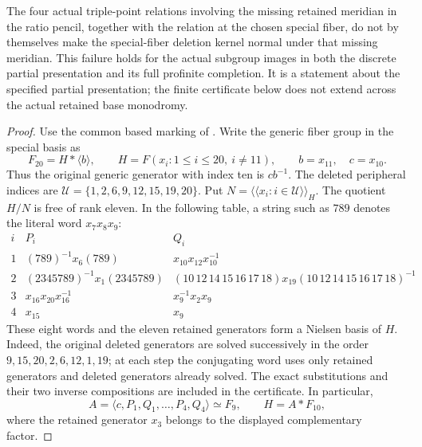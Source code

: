 The four actual triple-point relations involving the missing retained
meridian in the ratio pencil, together with the relation at the chosen
special fiber, do not by themselves make the special-fiber deletion
kernel normal under that missing meridian. This failure holds for the
actual subgroup images in both the discrete partial presentation and
its full profinite completion. It is a statement about the specified
partial presentation; the finite certificate below does not extend
across the actual retained base monodromy.

\begin{proof}
Use the common based marking of
.
Write the generic fiber group in the special basis as
\[
 F_{20}=H*\langle b\rangle,\qquad
 H=F(x_i:1\leq i\leq20,\ i\ne11),\qquad
 b=x_{11},\quad c=x_{10}.
 \tag{B.77.1}
\]
Thus the original generic generator with index ten is \(cb^{-1}\).
The deleted peripheral indices are
\(\mathcal U=\{1,2,6,9,12,15,19,20\}\). Put
\(N=\langle\!\langle x_i:i\in\mathcal U\rangle\!\rangle_H\).
The quotient \(H/N\) is free of rank eleven. In the following table,
a string such as \(789\) denotes the literal word \(x_7x_8x_9\):
\[
\begin{array}{c|c|c}
 i&P_i&Q_i\\\hline
 1&(789)^{-1}x_6(789)&x_{10}x_{12}x_{10}^{-1}\\
 2&(2345789)^{-1}x_1(2345789)&
       (10\,12\,14\,15\,16\,17\,18)x_{19}
       (10\,12\,14\,15\,16\,17\,18)^{-1}\\
 3&x_{16}x_{20}x_{16}^{-1}&x_9^{-1}x_2x_9\\
 4&x_{15}&x_9
\end{array}
 \tag{B.77.2}
\]
These eight words and the eleven retained generators form a Nielsen
basis of \(H\). Indeed, the original deleted generators are solved
successively in the order
\(9,15,20,2,6,12,1,19\); at each step the conjugating word uses
only retained generators and deleted generators already solved.
The exact substitutions and their two inverse compositions are
included in the certificate. In particular,
\[
 A=\langle c,P_1,Q_1,\ldots,P_4,Q_4\rangle\simeq F_9,
 \qquad H=A*F_{10},
 \tag{B.77.3}
\]
where the retained generator \(x_3\) belongs to the displayed
complementary factor.


\end{proof}
